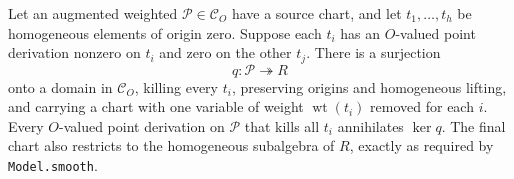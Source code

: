 \begin{proposition}
\label{claim:MX5}
Let an augmented weighted $\mathcal P\in\mathcal C_O$
have a source chart, and let $t_1,\ldots,t_h$ be homogeneous
elements of origin zero.  Suppose each $t_i$ has an
$O$-valued point derivation nonzero on $t_i$ and zero on
the other $t_j$.  There is a surjection
\[
        q:\mathcal P\twoheadrightarrow R
 \tag{MX.20}
\]
onto a domain in $\mathcal C_O$, killing every $t_i$,
preserving origins and homogeneous lifting, and carrying
a chart with one variable of weight $\operatorname{wt}(t_i)$
removed for each $i$.  Every $O$-valued point derivation on
$\mathcal P$ that kills all $t_i$ annihilates $\ker q$.
The final chart also restricts to the homogeneous subalgebra
of $R$, exactly as required by \texttt{Model.smooth}.
\end{proposition}
